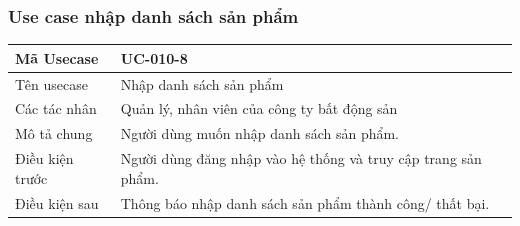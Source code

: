 \documentclass[12pt,a4paper]{article}
\begin{document}
    \subsubsection*{Use case nhập danh sách sản phẩm}
    \begin{table}[H]
        \centering
        \begin{tabular}{|p{3.5cm}|p{11.5cm}|c|}
            \hline
            Mã Usecase      & UC-010-8                                                      \\
            \hline
            Tên usecase     & Nhập danh sách sản phẩm                                       \\
            \hline
            Các tác nhân    & Quản lý, nhân viên của công ty bất động sản                   \\
            \hline
            Mô tả chung     & Người dùng muốn nhập danh sách sản phẩm.                      \\
            \hline

            Điều kiện trước & Người dùng đăng nhập vào hệ thống và truy cập trang sản phẩm. \\
            \hline

            Điều kiện sau   & Thông báo nhập danh sách sản phẩm thành công/ thất bại.       \\
            \hline


\end{tabular}
\end{table}
\end{document}
